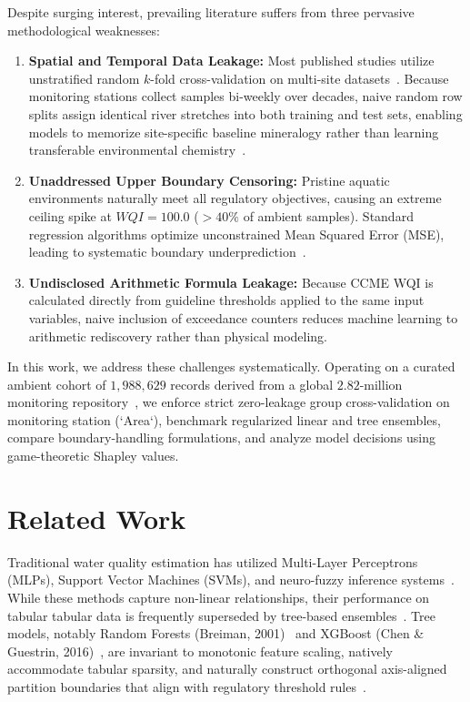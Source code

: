 \documentclass[journal,10pt,twocolumn]{IEEEtran}
\begin{document}
Despite surging interest, prevailing literature suffers from three pervasive methodological weaknesses:
\begin{enumerate}
    \item \textbf{Spatial and Temporal Data Leakage:} Most published studies utilize unstratified random $k$-fold cross-validation on multi-site datasets~\cite{ahmed2019efficient}. Because monitoring stations collect samples bi-weekly over decades, naive random row splits assign identical river stretches into both training and test sets, enabling models to memorize site-specific baseline mineralogy rather than learning transferable environmental chemistry~\cite{roberts2017cross}.
    \item \textbf{Unaddressed Upper Boundary Censoring:} Pristine aquatic environments naturally meet all regulatory objectives, causing an extreme ceiling spike at $WQI = 100.0$ ($>40\%$ of ambient samples). Standard regression algorithms optimize unconstrained Mean Squared Error (MSE), leading to systematic boundary underprediction~\cite{tobin1958estimation}.
    \item \textbf{Undisclosed Arithmetic Formula Leakage:} Because CCME WQI is calculated directly from guideline thresholds applied to the same input variables, naive inclusion of exceedance counters reduces machine learning to arithmetic rediscovery rather than physical modeling.
\end{enumerate}

In this work, we address these challenges systematically. Operating on a curated ambient cohort of $1,988,629$ records derived from a global $2.82$-million monitoring repository~\cite{karim2025comprehensive}, we enforce strict zero-leakage group cross-validation on monitoring station (`Area`), benchmark regularized linear and tree ensembles, compare boundary-handling formulations, and analyze model decisions using game-theoretic Shapley values.

\section{Related Work}
Traditional water quality estimation has utilized Multi-Layer Perceptrons (MLPs), Support Vector Machines (SVMs), and neuro-fuzzy inference systems~\cite{palani2008ann}. While these methods capture non-linear relationships, their performance on tabular tabular data is frequently superseded by tree-based ensembles~\cite{grinsztajn2022tree}. Tree models, notably Random Forests (Breiman, 2001)~\cite{breiman2001random} and XGBoost (Chen \& Guestrin, 2016)~\cite{chen2016xgboost}, are invariant to monotonic feature scaling, natively accommodate tabular sparsity, and naturally construct orthogonal axis-aligned partition boundaries that align with regulatory threshold rules~\cite{grinsztajn2022tree}.
\end{document}
